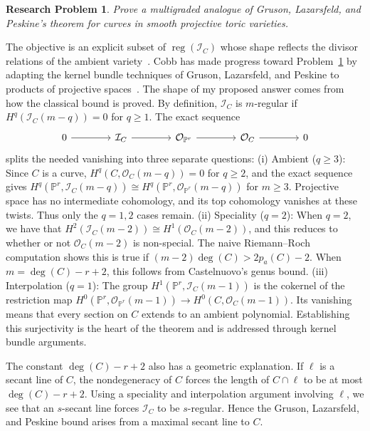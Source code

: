 \documentclass[11pt,reqno]{amsart}
\newtheorem{problem}[lemma]{Research Problem}
\theoremstyle{remark}
\newcommand{\reg}{\operatorname{reg}}
\newcommand{\PP}{\mathbb{P}}
\newcommand{\cI}{\mathcal{I}}
\newcommand{\cO}{\mathcal{O}}
\begin{document}
 \begin{problem}\label{prob:GLP}
 	Prove a multigraded analogue of Gruson, Lazarsfeld, and Peskine's theorem for curves in smooth projective toric varieties.
\end{problem}

The objective is an explicit subset of $\reg(\cI_C)$ whose shape reflects the divisor relations of the ambient variety~\cite{maclaganSmith04}. Cobb has made progress toward Problem~\ref{prob:GLP} by adapting the kernel bundle techniques of Gruson, Lazarsfeld, and Peskine to products of projective spaces~\cite{cobb24}. The shape of my proposed answer comes from how the classical bound is proved. By definition, $\cI_C$ is $m$-regular if $H^q(\cI_C(m-q))=0$ for $q\geq1$. The exact sequence 
\[
\begin{tikzcd}[row sep = .2em, column sep = 4em]
0 \arrow[r] & \cI_{C} \arrow[r] & \cO_{\PP^r} \arrow[r] & \cO_{C} \arrow[r] & 0 
\end{tikzcd}
\]
splits the needed vanishing into three separate questions: (i) Ambient ($q\geq3$): Since $C$ is a curve, $H^q(C,\cO_{C}(m-q))=0$ for $q\geq2$, and the exact sequence gives $H^q(\PP^r, \cI_{C}(m-q)) \cong H^q(\PP^r, \cO_{\PP^r}(m-q))$ for $m\geq3$. Projective space has no intermediate cohomology, and its top cohomology vanishes at these twists. Thus only the $q=1,2$ cases remain. (ii) Speciality ($q=2$): When $q=2$, we have that $H^2(\cI_C(m-2))\cong H^1(\cO_C(m-2))$, and this reduces to whether or not $\cO_{C}(m-2)$ is non-special. The naive Riemann--Roch computation shows this is true if $(m-2)\deg(C)>2p_a(C)-2$. When $m=\deg(C)-r+2$, this follows from Castelnuovo's genus bound. (iii) Interpolation ($q=1$): The group $H^1(\PP^r, \cI_{C}(m-1))$ is the cokernel of the restriction map $H^0(\PP^r, \cO_{\PP^r}(m-1))\to H^0(C, \cO_C(m-1))$. Its vanishing means that every section on $C$ extends to an ambient polynomial. Establishing this surjectivity is the heart of the theorem and is addressed through kernel bundle arguments. 

The constant $\deg(C)-r+2$ also has a geometric explanation. If $\ell$ is a secant line of $C$, the nondegeneracy of $C$ forces the length of $C\cap \ell$ to be at most $\deg(C)-r+2$. Using a speciality and interpolation argument involving $\ell$, we see that an $s$-secant line forces $\cI_{C}$ to be $s$-regular. Hence the Gruson, Lazarsfeld, and Peskine bound arises from a maximal secant line to $C$. 
\end{document}

